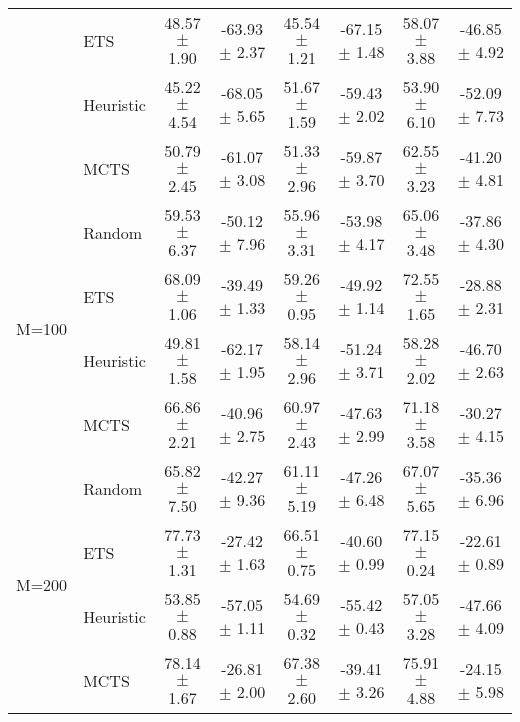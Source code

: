 \begin{tabular}{llcccccc}
                       & ETS             & 48.57 $\pm$ 1.90     & -63.93 $\pm$ 2.37     & 45.54 $\pm$ 1.21         & -67.15 $\pm$ 1.48        & 58.07 $\pm$ 3.88       & -46.85 $\pm$ 4.92      \\
                       & Heuristic         & 45.22 $\pm$ 4.54     & -68.05 $\pm$ 5.65     & 51.67 $\pm$ 1.59         & -59.43 $\pm$ 2.02        & 53.90 $\pm$ 6.10       & -52.09 $\pm$ 7.73      \\
                       & MCTS            & 50.79 $\pm$ 2.45     & -61.07 $\pm$ 3.08     & 51.33 $\pm$ 2.96         & -59.87 $\pm$ 3.70        & 62.55 $\pm$ 3.23       & -41.20 $\pm$ 4.81      \\
\midrule
\multirow{4}{*}{M=100} & Random          & 59.53 $\pm$ 6.37     & -50.12 $\pm$ 7.96     & 55.96 $\pm$ 3.31         & -53.98 $\pm$ 4.17        & 65.06 $\pm$ 3.48       & -37.86 $\pm$ 4.30      \\
                       & ETS             & 68.09 $\pm$ 1.06     & -39.49 $\pm$ 1.33     & 59.26 $\pm$ 0.95         & -49.92 $\pm$ 1.14        & 72.55 $\pm$ 1.65       & -28.88 $\pm$ 2.31      \\
                       & Heuristic         & 49.81 $\pm$ 1.58     & -62.17 $\pm$ 1.95     & 58.14 $\pm$ 2.96         & -51.24 $\pm$ 3.71        & 58.28 $\pm$ 2.02       & -46.70 $\pm$ 2.63      \\
                       & MCTS            & 66.86 $\pm$ 2.21     & -40.96 $\pm$ 2.75     & 60.97 $\pm$ 2.43         & -47.63 $\pm$ 2.99        & 71.18 $\pm$ 3.58       & -30.27 $\pm$ 4.15      \\
\midrule
\multirow{4}{*}{M=200} & Random          & 65.82 $\pm$ 7.50     & -42.27 $\pm$ 9.36     & 61.11 $\pm$ 5.19         & -47.26 $\pm$ 6.48        & 67.07 $\pm$ 5.65       & -35.36 $\pm$ 6.96      \\
                       & ETS             & 77.73 $\pm$ 1.31     & -27.42 $\pm$ 1.63     & 66.51 $\pm$ 0.75         & -40.60 $\pm$ 0.99        & 77.15 $\pm$ 0.24       & -22.61 $\pm$ 0.89      \\
                       & Heuristic         & 53.85 $\pm$ 0.88     & -57.05 $\pm$ 1.11     & 54.69 $\pm$ 0.32         & -55.42 $\pm$ 0.43        & 57.05 $\pm$ 3.28       & -47.66 $\pm$ 4.09      \\
                       & MCTS            & 78.14 $\pm$ 1.67     & -26.81 $\pm$ 2.00     & 67.38 $\pm$ 2.60         & -39.41 $\pm$ 3.26        & 75.91 $\pm$ 4.88       & -24.15 $\pm$ 5.98     \\
\bottomrule
\end{tabular}